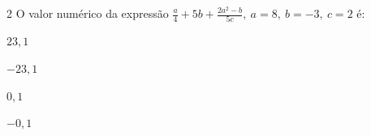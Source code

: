 

\num{2} O valor numérico da expressão
$\frac{a}{4} + 5b + \frac{2a^{2} - b}{5c},\ a = 8,\ b = - 3,\ c = 2$
é:

\begin{multicols}{2}
\begin{escolha}[itemsep=0pt]
\item $23,1$
\item $- 23,1$
\item $0,1$
\item $- 0,1$
\end{escolha}
\end{multicols}



